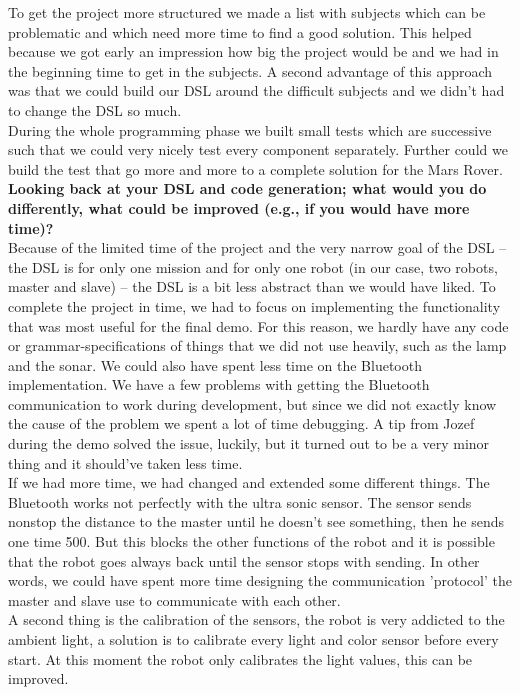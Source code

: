 \documentclass[11pt,a4paper]{article}
\begin{document}
To get the project more structured we made a list with subjects which can be problematic and which need more time to find a good solution. This helped because we got early an impression how big the project would be and we had in the beginning time to get in the subjects. A second advantage of this approach was that we could build our DSL around the difficult subjects and we didn't had to change the DSL so much. \\
During the whole programming phase we built small tests which are successive such that we could very nicely test every component separately. Further could we build the test that go more and more to a complete solution for the Mars Rover.\\

\textbf{Looking back at your DSL and code generation; what would you do differently, what could be improved (e.g., if you would have more time)?}\\
Because of the limited time of the project and the very narrow goal of the DSL -- the DSL is for only one mission and for only one robot (in our case, two robots, master and slave) -- the DSL is a bit less abstract than we would have liked. To complete the project in time, we had to focus on implementing the functionality that was most useful for the final demo. For this reason, we hardly have any code or grammar-specifications of things that we did not use heavily, such as the lamp and the sonar. 
We could also have spent less time on the Bluetooth implementation. We have a few problems with getting the Bluetooth communication to work during development, but since we did not exactly know the cause of the problem we spent a lot of time debugging. A tip from Jozef during the demo solved the issue, luckily, but it turned out to be a very minor thing and it should've taken less time.\\
If we had more time, we had changed and extended some different things. The Bluetooth works not perfectly with the ultra sonic sensor. The sensor sends nonstop the distance to the master until he doesn't see something, then he sends one time 500. But this blocks the other functions of the robot and it is possible that the robot goes always back until the sensor stops with sending. In other words, we could have spent more time designing the communication 'protocol' the master and slave use to communicate with each other. \\
A second thing is the calibration of the sensors, the robot is very addicted to the ambient light, a solution is to calibrate every light and color sensor before every start. At this moment the robot only calibrates the light values, this can be improved.\\
\end{document}

